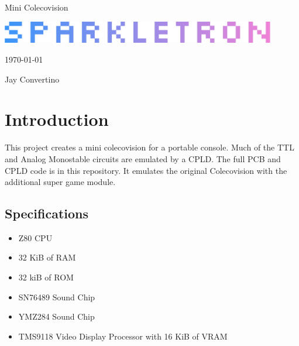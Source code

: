 \begin{titlepage}
  \begin{center}

  {\Huge Mini Colecovision}

  \vspace{25mm}

  \includegraphics[width=0.90\textwidth,height=\textheight,keepaspectratio]{img/SPARKLETRON.png}

  \vspace{25mm}

  \today

  \vspace{15mm}

  {\Large Jay Convertino}

  \end{center}
\end{titlepage}

\tableofcontents

\newpage

\section{Introduction}

\par
This project creates a mini colecovision for a portable console. Much of the TTL and Analog Monostable circuits
are emulated by a CPLD. The full PCB and CPLD code is in this repository. It emulates the original Colecovision
with the additional super game module.

\subsection{Specifications}

\par
\begin{itemize}
  \item Z80 CPU
  \item 32 KiB of RAM
  \item 32 kiB of ROM
  \item SN76489 Sound Chip
  \item YMZ284 Sound Chip
  \item TMS9118 Video Display Processor with 16 KiB of VRAM
\end{itemize}

